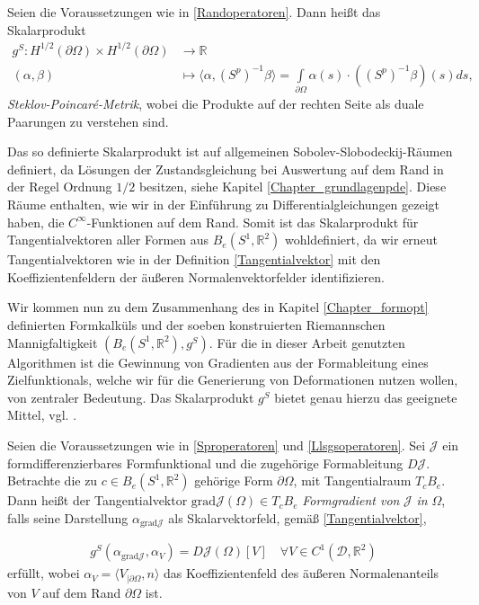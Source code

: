 \begin{defi}\label{Stek-Poi-metrik}
Seien die Voraussetzungen wie in \ref{Randoperatoren}. Dann heißt das Skalarprodukt
\begin{align*}
	g^S: H^{1/2}(\partial \Omega) \times H^{1/2}(\partial \Omega) &\rightarrow \mathbb{R} \\
	(\alpha,\beta) &\mapsto \langle \alpha, (S^p)^{-1}\beta \rangle = \underset{\partial \Omega}{\int} \alpha(s)\cdot((S^p)^{-1}\beta)(s)ds,
\end{align*}
\textit{Steklov-Poincaré-Metrik}, wobei die Produkte auf der rechten Seite als duale Paarungen zu verstehen sind. 
\end{defi}

Das so definierte Skalarprodukt ist auf allgemeinen Sobolev-Slobodeckij-Räumen definiert, da Lösungen der Zustandsgleichung bei Auswertung auf dem Rand in der Regel Ordnung $1/2$ besitzen, siehe Kapitel \ref{Chapter_grundlagenpde}. Diese Räume enthalten, wie wir in der Einführung zu Differentialgleichungen gezeigt haben, die $C^\infty$-Funktionen auf dem Rand. Somit ist das Skalarprodukt für Tangentialvektoren aller Formen aus $B_e(S^1, \mathbb{R}^2)$ wohldefiniert, da wir erneut Tangentialvektoren wie in der Definition \ref{Tangentialvektor} mit den Koeffizientenfeldern der äußeren Normalenvektorfelder identifizieren.

Wir kommen nun zu dem Zusammenhang des in Kapitel \ref{Chapter_formopt} definierten Formkalküls und der soeben konstruierten Riemannschen Mannigfaltigkeit $(B_e(S^1,\mathbb{R}^2),g^S)$.
Für die in dieser Arbeit genutzten Algorithmen ist die Gewinnung von Gradienten aus der Formableitung eines Zielfunktionals, welche wir für die Generierung von Deformationen nutzen wollen, von zentraler Bedeutung. Das Skalarprodukt $g^S$ bietet genau hierzu das geeignete Mittel, vgl. \cite{bfgs2}.

\begin{defi}[Formgradient]\label{Formgradientdefi}
Seien die Voraussetzungen wie in \ref{Sproperatoren} und \ref{Llsgsoperatoren}.
Sei $\mathcal{J}$ ein formdifferenzierbares Formfunktional und die zugehörige Formableitung $D\mathcal{J}$. Betrachte die zu $c\in B_e(S^1,\mathbb{R}^2)$ gehörige Form $\partial\Omega$, mit Tangentialraum $T_cB_e$. Dann heißt der Tangentialvektor $\text{grad} \mathcal{J}(\Omega) \in T_cB_e$ \textit{Formgradient von} $\mathcal{J}$ \textit{in } $\Omega$, falls seine Darstellung $\alpha_{\text{grad} \mathcal{J}}$ als Skalarvektorfeld, gemäß \ref{Tangentialvektor}, 


\begin{align}\label{Gradientengleichung}
	g^S(\alpha_{\text{grad}\mathcal{J}}, \alpha_V) = D\mathcal{J}(\Omega)[V] \quad \forall V\in C^1(\mathcal{D},\mathbb{R}^2)
\end{align}
erfüllt, wobei $\alpha_V = \langle V_{\vert \partial\Omega}, n\rangle$ das Koeffizientenfeld des äußeren Normalenanteils von $V$ auf dem Rand $\partial \Omega$ ist.

\end{defi}

